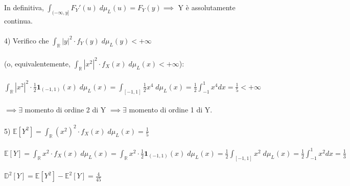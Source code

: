 \documentclass{article}
\begin{document}
In definitiva, $\int_{(-\infty,y]}^{}F_{Y}'(u) \; d\mu_{L}(u) = F_{Y}(y) \implies$ Y è assolutamente continua.\\
\\
4) Verifico che $\int_{\mathbb{R}}^{}|y|^{2}\cdot f_{Y}(y) \; d\mu_{L}(y) < +\infty$\\ \\
(o, equivalentemente, $\int_{\mathbb{R}}^{}|x^{2}|^{2}\cdot f_{X}(x) \; d\mu_{L}(x) < +\infty$):\\ \\
$\int_{\mathbb{R}}^{}|x^{2}|^{2}\cdot \frac{1}{2}\mathbf{1}_{(-1,1)}(x) \; d\mu_{L}(x) = \int_{[-1,1]}{}\frac{1}{2}x^{4} \; d\mu_{L}(x) = \frac{1}{2} \int_{-1}^{1}x^{4}dx = \frac{1}{5} < +\infty$\\ \\
$\implies \exists$ momento di ordine 2 di Y $\implies \exists$ momento di ordine 1 di Y.\\
\\
5) $\mathbb{E}[Y^{2}] = \int_{\mathbb{R}}^{}(x^{2})^{2}\cdot f_{X}(x) \; d\mu_{L}(x) = \frac{1}{5}$\\ \\
$\mathbb{E}[Y] = \int_{\mathbb{R}}^{}x^{2}\cdot f_{X}(x) \; d\mu_{L}(x) = \int_{\mathbb{R}}^{}x^{2}\cdot \frac{1}{2}\mathbf{1}_{(-1,1)}(x) \; d\mu_{L}(x) = \frac{1}{2} \int_{[-1,1]}^{}x^{2} \; d\mu_{L}(x) = \frac{1}{2} \int_{-1}^{1}x^{2}dx = \frac{1}{3}$\\ \\
$\mathbb{D}^{2}[Y] = \mathbb{E}[Y^{2}] - \mathbb{E}^{2}[Y] = \frac{4}{45}$
\end{document}
